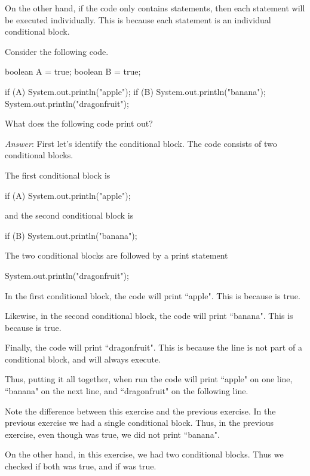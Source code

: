 On the other hand, if the code only contains  statements, then each  statement will be executed individually. This is because each  statement is an individual conditional block.

\begin{example}
Consider the following code.

\begin{code}
boolean A = true;
boolean B = true;

if (A) 
{
    System.out.println("apple");
} 
if (B) 
{
    System.out.println("banana");
} 
System.out.println("dragonfruit");
\end{code}

What does the following code print out?

\emph{Answer}: First let's identify the conditional block. The code consists of two conditional blocks. 

The first conditional block is

\begin{code}
if (A) 
{
    System.out.println("apple");
} 
\end{code}

and the second conditional block is

\begin{code}
if (B) 
{
    System.out.println("banana");
} 
\end{code}

The two conditional blocks are followed by a print statement

\begin{code}
System.out.println("dragonfruit");
\end{code}

In the first conditional block, the code will print ``apple". This is because  is true.

Likewise, in the second conditional block, the code will print ``banana". This is because  is true.

Finally, the code will print ``dragonfruit". This is because the line  is not part of a conditional block, and will always execute.

Thus, putting it all together, when run the code will print ``apple" on one line, ``banana" on the next line, and ``dragonfruit" on the following line. 

Note the difference between this exercise and the previous exercise. In the previous exercise we had a single conditional block. Thus, in the previous exercise, even though  was true, we did not print ``banana". 

On the other hand, in this exercise, we had two conditional blocks. Thus we checked if both  was true, and if  was true.
\end{example}

